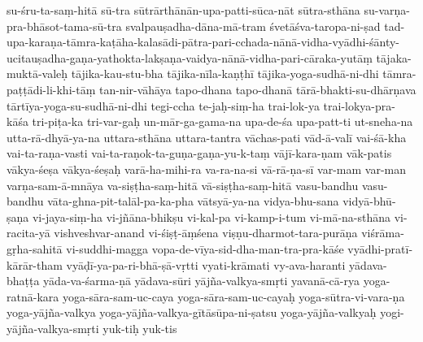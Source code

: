 {{su-śru-ta-saṃ-hitā
sū-tra
sūtrārthānān-upa-patti-sūca-nāt
sūtra-sthāna
su-varṇa-pra-bhāsot-tama-sū-tra
svalpauṣadha-dāna-mā-tram
śvetāśva-taropa-ni-ṣad
tad-upa-karaṇa-tāmra-kaṭāha-kalasādi-pātra-pari-cchada-nānā-vidha-vyādhi-śānty-ucitauṣadha-gaṇa-yathokta-lakṣaṇa-vaidya-nānā-vidha-pari-cāraka-yutāṃ
tājaka-muktā-valeḥ
tājika-kau-stu-bha
tājika-nīla-kaṇṭhī
tājika-yoga-sudhā-ni-dhi
tāmra-paṭṭādi-li-khi-tāṃ
tan-nir-vāhāya
tapo-dhana
tapo-dhanā
tārā-bhakti-su-dhārṇava
tārtīya-yoga-su-sudhā-ni-dhi
tegi-ccha
te-jaḥ-siṃ-ha
trai-lok-ya
trai-lokya-pra-kāśa
tri-piṭa-ka
tri-var-gaḥ
un-mār-ga-gama-na
upa-de-śa
upa-patt-ti
ut-sneha-na
utta-rā-dhyā-ya-na
uttara-sthāna
uttara-tantra
vāchas-pati
vād-ā-valī
vai-śā-kha
vai-ta-raṇa-vasti
vai-ta-raṇok-ta-guṇa-gaṇa-yu-k-taṃ
vājī-kara-ṇam
vāk-patis
vākya-śeṣa
vākya-śeṣaḥ
varā-ha-mihi-ra
va-ra-na-si
vā-rā-ṇa-sī
var-mam
var-man
varṇa-sam-ā-mnāya
va-siṣṭha-saṃ-hitā
vā-siṣṭha-saṃ-hitā
vasu-bandhu
vasu-bandhu
vāta-ghna-pit-talāl-pa-ka-pha
vātsyā-ya-na
vidya-bhu-sana
vidyā-bhū-ṣaṇa
vi-jaya-siṃ-ha
vi-jñāna-bhikṣu
vi-kal-pa
vi-kamp-i-tum
vi-mā-na-sthāna
vi-racita-yā
vishveshvar-anand
vi-śiṣṭ-āṃśena
viṣṇu-dharmot-tara-purāṇa
viśrāma-gṛha-sahitā
vi-suddhi-magga
vopa-de-vīya-sid-dha-man-tra-pra-kāśe
vyādhi-pratī-kārār-tham
vyāḍī-ya-pa-ri-bhā-ṣā-vṛtti
vyati-krāmati
vy-ava-haranti
yādava-bhaṭṭa
yāda-va-śarma-ṇā
yādava-sūri
yājña-valkya-smṛti
yavanā-cā-rya
yoga-ratnā-kara
yoga-sāra-sam-uc-caya
yoga-sāra-sam-uc-cayaḥ
yoga-sūtra-vi-vara-ṇa
yoga-yājña-valkya
yoga-yājña-valkya-gītāsūpa-ni-ṣatsu
yoga-yājña-valkyaḥ
yogi-yājña-valkya-smṛti
yuk-tiḥ
yuk-tis
}}
\normalfontlatin %
\endinput
